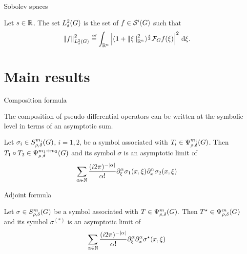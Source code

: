 \documentclass{beamer}
\begin{document}
\begin{frame}
    {Sobolev spaces}

    \begin{definition}
        Let $s \in \mathbb{R}$.
        The set $L^2_{s}(G)$ is the set of $f \in {\mathcal{S}' (G)}$ such that
        \begin{align*}
            \norm [\Sobolev s] f^2
            \defeq \int_{\R^n} \abs{(1 + \norm [\R^n] \xi^2)^\frac s 2 \Fourier f(\xi)}^2 \dd \xi.
        \end{align*}
    \end{definition}
\end{frame}

\section{Main results}

\begin{frame}
    {Composition formula}

    The composition of pseudo-differential operators can be written at the symbolic level in terms of an asymptotic sum.

    \begin{theorem}

        Let $\sigma_i \in S^{m_i}_{\rho, \delta}(G)$, $i = 1, 2$,
        be a symbol associated with $T_i \in \Psi^{m_i}_{\rho, \delta}(G)$.
        Then $T_1 \circ T_2 \in \Psi^{m_1 + m_2}_{\rho, \delta}(G)$ and its symbol $\sigma$ is an asymptotic limit of
        \begin{align*}
            \sum_{\alpha \in \N} \frac {(\i \turn)^{-\abs \alpha}} {\alpha!}
            \iD {\xi^\alpha} \sigma_1(x, \xi)
            \iD {x^\alpha} \sigma_2(x, \xi)
        \end{align*}
    \end{theorem}
\end{frame}

\begin{frame}
    {Adjoint formula}

    \begin{theorem}

        Let $\sigma \in S^{m}_{\rho, \delta}(G)$
        be a symbol associated with $T \in \Psi^{m}_{\rho, \delta}(G)$.
        Then ${T}^\star \in \Psi^{m}_{\rho, \delta}(G)$ and its symbol $\sigma^{(*)}$ is an asymptotic limit of
        \begin{align*}
            \sum_{\alpha \in \N} \frac {(\i \turn)^{-\abs \alpha}} {\alpha!}
            \iD {\xi^\alpha} \iD {x^\alpha} \adj \sigma(x, \xi)
        \end{align*}
    \end{theorem}
\end{frame}
\end{document}
